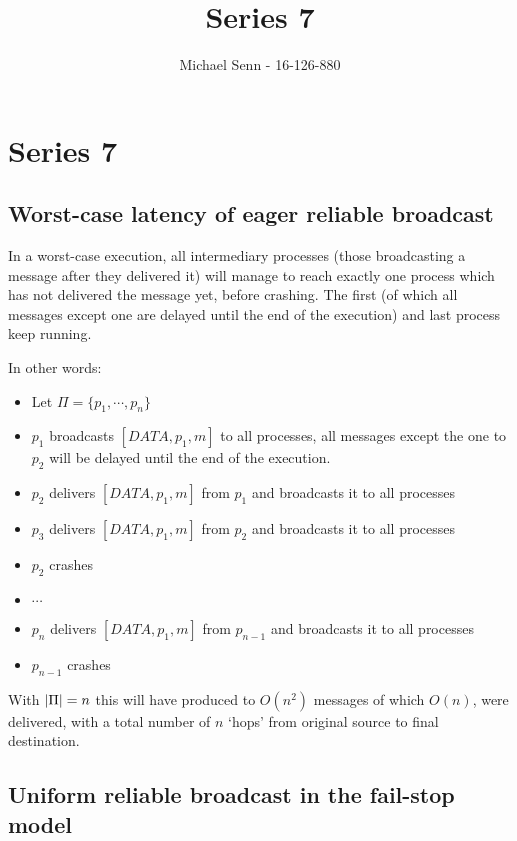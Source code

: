 \documentclass[a4paper]{scrreprt}
\title{Series 7}
\author{Michael Senn \maillink{michael.senn@students.unibe.ch} - 16-126-880}
\date{\printdate}
\DeclarePairedDelimiter\abs{\lvert}{\rvert}
\begin{document}
\maketitle


\setcounter{chapter}{6}

\chapter{Series 7}

\section{Worst-case latency of eager reliable broadcast}

In a worst-case execution, all intermediary processes (those broadcasting a
message after they delivered it) will manage to reach exactly one process which
has not delivered the message yet, before crashing. The first (of which all
messages except one are delayed until the end of the execution) and last
process keep running.

In other words:
\begin{itemize}
	\item Let $\Pi = \{p_1, \cdots, p_n\}$
	\item $p_1$ broadcasts $[DATA, p_1, m]$ to all processes, all messages
		except the one to $p_2$ will be delayed until the end of the
		execution.
	\item $p_2$ delivers $[DATA, p_1, m]$ from $p_1$ and broadcasts it to
		all processes
	\item $p_3$ delivers $[DATA, p_1, m]$ from $p_2$ and broadcasts it to
		all processes
	\item $p_2$ crashes
	\item $\cdots$
	\item $p_n$ delivers $[DATA, p_1, m]$ from $p_{n - 1}$ and broadcasts
		it to all processes
	\item $p_{n - 1}$ crashes
\end{itemize}

With $\abs{\Pi} = n$ this will have produced to $O(n^2)$ messages of which
$O(n)$, were delivered, with a total number of $n$ `hops' from original source
to final destination.

\section{Uniform reliable broadcast in the fail-stop model}
\end{document}
